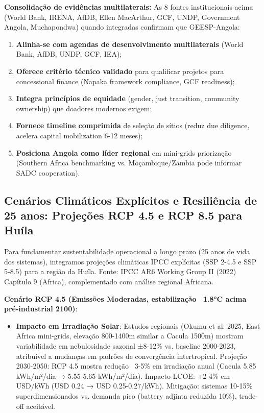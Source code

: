\documentclass[12pt, a4paper]{article}
\begin{document}
{{{{{{{{{{{{\textbf{Consolidação de evidências multilaterais:} As 8 fontes institucionais acima (World Bank, IRENA, AfDB, Ellen MacArthur, GCF, UNDP, Government Angola, Muchapondwa) quando integradas confirmam que GEESP-Angola:
\begin{enumerate}
\item \textbf{Alinha-se com agendas de desenvolvimento multilaterais} (World Bank, AfDB, UNDP, GCF, IEA);
\item \textbf{Oferece critério técnico validado} para qualificar projetos para concessional finance (Napaka framework compliance, GCF readiness);
\item \textbf{Integra princípios de equidade} (gender, just transition, community ownership) que doadores modernos exigem;
\item \textbf{Fornece timeline comprimida} de seleção de sítios (reduz due diligence, acelera capital mobilization 6-12 meses);
\item \textbf{Posiciona Angola como líder regional} em mini-grids priorização (Southern Africa benchmarking vs. Moçambique/Zambia pode informar SADC cooperation).
\end{enumerate}



\subsection{Cenários Climáticos Explícitos e Resiliência de 25 anos: Projeções RCP 4.5 e RCP 8.5 para Huíla}

Para fundamentar sustentabilidade operacional a longo prazo (25 anos de vida dos sistemas), integramos projeções climáticas IPCC explícitas (SSP 2-4.5 e SSP 5-8.5) para a região da Huíla. Fonte: IPCC AR6 Working Group II (2022) Capítulo 9 (Africa), complementado com análise regional Africana.

\textbf{Cenário RCP 4.5 (Emissões Moderadas, estabilização ~1.8°C acima pré-industrial 2100)}:
\begin{itemize}
\item \textbf{Impacto em Irradiação Solar}: Estudos regionais (Okumu et al. 2025, East Africa mini-grids, elevação 800-1400m similar a Cacula 1500m) mostram variabilidade em nebulosidade sazonal ±8-12\% vs. baseline 2000-2023, atribuível a mudanças em padrões de convergência intertropical. Projeção 2030-2050: RCP 4.5 mostra redução ~3-5\% em irradiação anual (Cacula 5.85 kWh/m²/dia → 5.55-5.65 kWh/m²/dia). Impacto LCOE: +2-4\% em USD/kWh (USD 0.24 → USD 0.25-0.27/kWh). Mitigação: sistemas 10-15\% superdimensionados vs. demanda pico (battery adjinta reduzida 10\%), trade-off aceitável.


\end{itemize}}}}}}}}}}}}}
\end{document}
